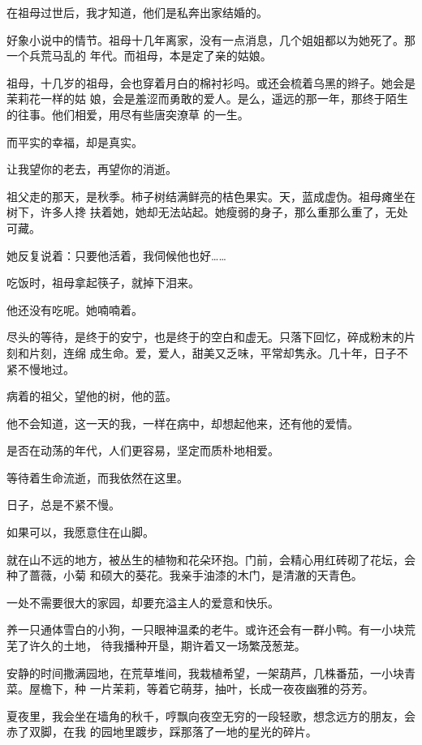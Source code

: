 		在祖母过世后，我才知道，他们是私奔出家结婚的。

		好象小说中的情节。祖母十几年离家，没有一点消息，几个姐姐都以为她死了。那一个兵荒马乱的
	年代。而祖母，本是定了亲的姑娘。

		祖母，十几岁的祖母，会也穿着月白的棉衬衫吗。或还会梳着乌黑的辫子。她会是茉莉花一样的姑
	娘，会是羞涩而勇敢的爱人。是么，遥远的那一年，那终于陌生的往事。他们相爱，用尽有些唐突潦草
	的一生。

		而平实的幸福，却是真实。\par
		让我望你的老去，再望你的消逝。

		祖父走的那天，是秋季。柿子树结满鲜亮的桔色果实。天，蓝成虚伪。祖母瘫坐在树下，许多人搀
	扶着她，她却无法站起。她瘦弱的身子，那么重那么重了，无处可藏。

		她反复说着：只要他活着，我伺候他也好……\par
		吃饭时，祖母拿起筷子，就掉下泪来。\par
		他还没有吃呢。她喃喃着。

		尽头的等待，是终于的安宁，也是终于的空白和虚无。只落下回忆，碎成粉末的片刻和片刻，连绵
	成生命。爱，爱人，甜美又乏味，平常却隽永。几十年，日子不紧不慢地过。

		病着的祖父，望他的树，他的蓝。\par
		他不会知道，这一天的我，一样在病中，却想起他来，还有他的爱情。\par
		是否在动荡的年代，人们更容易，坚定而质朴地相爱。\par
		等待着生命流逝，而我依然在这里。\par
		日子，总是不紧不慢。

	\endwriting



		如果可以，我愿意住在山脚。

		就在山不远的地方，被丛生的植物和花朵环抱。门前，会精心用红砖砌了花坛，会种了蔷薇，小菊
	和硕大的葵花。我亲手油漆的木门，是清澈的天青色。

		一处不需要很大的家园，却要充溢主人的爱意和快乐。

		养一只通体雪白的小狗，一只眼神温柔的老牛。或许还会有一群小鸭。有一小块荒芜了许久的土地，
	待我播种开垦，期许着又一场繁茂葱茏。

		安静的时间撒满园地，在荒草堆间，我栽植希望，一架葫芦，几株番茄，一小块青菜。屋檐下，种
	一片茉莉，等着它萌芽，抽叶，长成一夜夜幽雅的芬芳。

		夏夜里，我会坐在墙角的秋千，哼飘向夜空无穷的一段轻歌，想念远方的朋友，会赤了双脚，在我
	的园地里踱步，踩那落了一地的星光的碎片。

